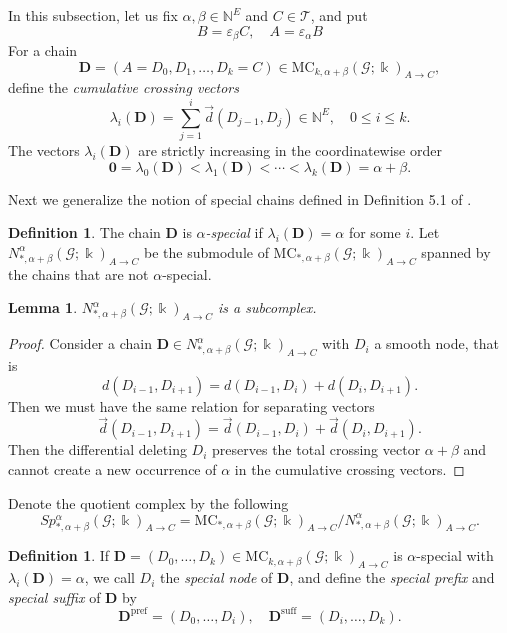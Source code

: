 \documentclass[10pt]{amsart}
\theoremstyle{plain}
\newtheorem{lemma}[theorem]{Lemma}
\theoremstyle{definition}
\newtheorem{definition}[theorem]{Definition}
\newcommand{\zero}{\mathbf{0}}
\newcommand{\NN}{\mathbb{N}}
\newcommand{\T}{\mathcal{T}}
\newcommand{\G}{\mathcal{G}}
\newcommand{\MC}{\mathrm{MC}}
\newcommand{\eps}{\varepsilon}
\newcommand{\kk}{\Bbbk}
\newcommand{\bD}{\boldsymbol{D}}
\begin{document}
In this subsection, let us fix $\alpha,\beta\in\NN^E$ and $C\in\T$, and put
\[
B=\eps_\beta C, \quad A=\eps_\alpha B
\]
For a chain
\[
\bD=(A=D_0,D_1,\ldots,D_k=C)\in\MC_{k,\alpha+\beta}(\G;\kk)_{A\to C},
\]
define the \emph{cumulative crossing vectors}
\[
\lambda_i(\bD)=\sum_{j=1}^i\vec{d}(D_{j-1},D_j)\in\NN^E, \quad 0\leq i\leq k.
\]
The vectors $\lambda_i(\bD)$ are strictly increasing in the coordinatewise order
\[
\zero=\lambda_0(\bD)<\lambda_1(\bD)<\cdots<\lambda_k(\bD)=\alpha+\beta.
\]

Next we generalize the notion of special chains defined in Definition 5.1 of \cite{Koizumi2026a}.

\begin{definition}
The chain $\bD$ is \emph{$\alpha$-special} if $\lambda_i(\bD)=\alpha$ for some $i$. Let $N^\alpha_{*,\alpha+\beta}(\G;\kk)_{A\to C}$ be the submodule of $\MC_{*,\alpha+\beta}(\G;\kk)_{A\to C}$ spanned by the chains that are not $\alpha$-special.
\end{definition}

\begin{lemma}\label{lem:general-nonspecial}
$N^\alpha_{*,\alpha+\beta}(\G;\kk)_{A\to C}$ is a subcomplex.
\end{lemma}

\begin{proof}
Consider a chain $\bD\in N^\alpha_{*,\alpha+\beta}(\G;\kk)_{A\to C}$ with $D_i$ a smooth node, that is
\[
d(D_{i-1},D_{i+1})=d(D_{i-1},D_i)+d(D_i,D_{i+1}).
\]
Then we must have the same relation for separating vectors
\[
\vec{d}(D_{i-1},D_{i+1})=\vec{d}(D_{i-1},D_i)+\vec{d}(D_i,D_{i+1}).
\]
Then the differential deleting $D_i$ preserves the total crossing vector $\alpha+\beta$ and cannot create a new occurrence of $\alpha$ in the cumulative crossing vectors.
\end{proof}

Denote the quotient complex by the following
\[
Sp^\alpha_{*,\alpha+\beta}(\G;\kk)_{A\to C}=\MC_{*,\alpha+\beta}(\G;\kk)_{A\to C}/N^\alpha_{*,\alpha+\beta}(\G;\kk)_{A\to C}.
\]

\begin{definition}
If $\bD=(D_0,\ldots,D_k)\in\MC_{k,\alpha+\beta}(\G;\kk)_{A\to C}$ is $\alpha$-special with $\lambda_i(\bD)=\alpha$, we call $D_i$ the \emph{special node} of $\bD$, and define the \emph{special prefix} and \emph{special suffix} of $\bD$ by
\[
\bD^{\text{pref}}=(D_0,\ldots,D_i),\quad \bD^{\text{suff}}=(D_i,\ldots,D_k).
\]
\end{definition}
\end{document}
